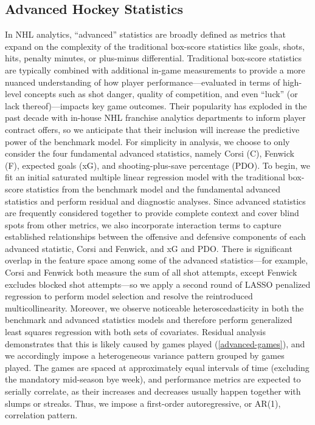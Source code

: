 \documentclass[10pt]{article}
\begin{document}
\subsection{Advanced Hockey Statistics}
In NHL analytics, “advanced” statistics are broadly defined as metrics that expand on the complexity of the traditional box-score statistics like goals, shots, hits, penalty minutes, or plus-minus differential. Traditional box-score statistics are typically combined with additional in-game measurements to provide a more nuanced understanding of how player performance—evaluated in terms of high-level concepts such as shot danger, quality of competition, and even “luck” (or lack thereof)—impacts key game outcomes. Their popularity has exploded in the past decade with in-house NHL franchise analytics departments to inform player contract offers, so we anticipate that their inclusion will increase the predictive power of the benchmark model. For simplicity in analysis, we choose to only consider the four fundamental advanced statistics, namely Corsi (C), Fenwick (F), expected goals (xG), and shooting-plus-save percentage (PDO).
To begin, we fit an initial saturated multiple linear regression model with the traditional box-score statistics from the benchmark model and the fundamental advanced statistics and perform residual and diagnostic analyses. Since advanced statistics are frequently considered together to provide complete context and cover blind spots from other metrics, we also incorporate interaction terms to capture established relationships between the offensive and defensive components of each advanced statistic, Corsi and Fenwick, and xG and PDO. There is significant overlap in the feature space among some of the advanced statistics—for example, Corsi and Fenwick both measure the sum of all shot attempts, except Fenwick excludes blocked shot attempts—so we apply a second round of LASSO penalized regression to perform model selection and resolve the reintroduced multicollinearity. 
Moreover, we observe noticeable heteroscedasticity in both the benchmark and advanced statistics models and therefore perform generalized least squares regression with both sets of covariates. Residual analysis demonstrates that this is likely caused by games played (\autoref{advanced-games}),
and we accordingly impose a heterogeneous variance pattern grouped by games played. The games are spaced at approximately equal intervals of time (excluding the mandatory mid-season bye week), and performance metrics are expected to serially correlate, as their increases and decreases usually happen together with slumps or streaks. Thus, we impose a first-order autoregressive, or AR(1), correlation pattern.
\end{document}
